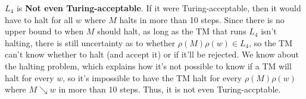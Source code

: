 \documentclass[12pt]{article}
\begin{document}
\begin{enumerate}
    $L_4$ is \textbf{Not even Turing-acceptable}. If it were Turing-acceptable, then it would have to halt for all $w$ where $M$ halts in more than 10 steps. Since there is no upper bound to when $M$ should halt, as long as the TM that runs $L_4$ isn't halting, there is still uncertainty as to whether $\rho(M)\rho(w) \in L_4$, so the TM can't know whether to halt (and accept it) or if it'll be rejected. We know about the halting problem, which explains how it's not possible to know if a TM will halt for every $w$, so it's impossible to have the TM halt for every $\rho(M)\rho(w)$ where $M \searrow w$ in more than 10 steps. Thus, it is not even Turing-accptable.
\color{black}


\end{enumerate}
\end{document}
